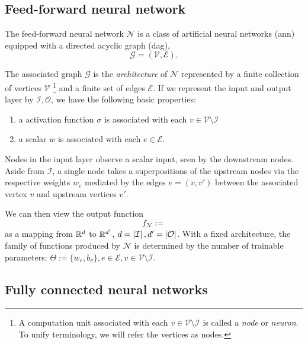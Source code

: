 \subsection{Feed-forward neural network}

The feed-forward neural network $\mathcal{N}$ is a class of artificial neural
networks (\gls{ann}) equipped with a directed acyclic graph (\gls{dag}),
\begin{equation*}
    \mathcal{G} = (\mathcal{V}, \mathcal{E}).
\end{equation*}

The associated graph $\mathcal{G}$ is the \textit{architecture} of $\mathcal{N}$
represented by a finite collection of vertices $\mathcal{V}$ 
\footnote{
    A computation unit associated with each $v \in \mathcal{V} \setminus \mathcal{I}$
    is called a \textit{node} or \textit{neuron}. To unify terminology, we will 
    refer the vertices as nodes.
}
and a finite set of edges $\mathcal{E}$. If we represent the input and output
layer by $\mathcal{I, O}$, we have the following basic properties: 
\begin{enumerate}
    \item a activation function $\sigma$ is associated with each $v \in
    \mathcal{V} \setminus \mathcal{I}$
    \item a scalar $w$ is associated with each $e \in
    \mathcal{E}$.    
\end{enumerate}

Nodes in the input layer observe a scalar input, seen by the downstream nodes.
Aside from $\mathcal{I}$, a single node takes a superpositions of the upstream
nodes via the respective weights $w_e$ mediated by the edges $e = (v, v')$
between the associated vertex $v$ and upstream vertices $v'$. 

We can then view the output function 
\begin{equation*}
    f_{\mathcal{N}} := 
\end{equation*}
as a mapping from $\mathbb{R}^d$ to $\mathbb{R}^{d'}$, $d = \left| \mathcal{I} \right|, d' =
\left| \mathcal{O} \right|$. With a fixed architecture, the family of functions produced
by $\mathcal{N}$ is determined by the number of trainable parameters: $\Theta :=
\{w_e,b_v\}, e \in \mathcal{E}, v \in \mathcal{V} \setminus \mathcal{I}$.

\subsection{Fully connected neural networks}


